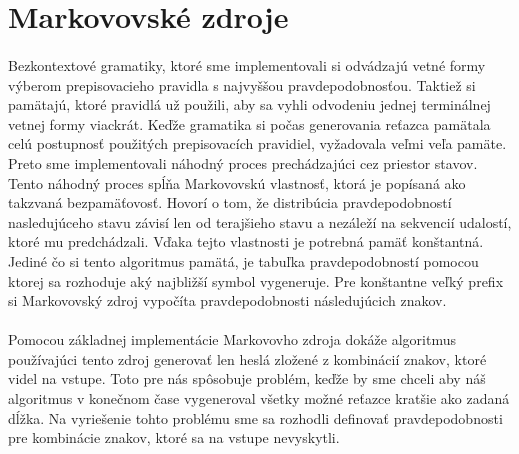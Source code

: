 \section{Markovovské zdroje}
\paragraph{}
Bezkontextové gramatiky, ktoré sme implementovali si odvádzajú vetné formy výberom prepisovacieho pravidla s najvyššou pravdepodobnosťou. Taktiež si pamätajú, ktoré pravidlá už použili, aby sa vyhli odvodeniu jednej terminálnej vetnej formy viackrát. Keďže gramatika si počas generovania reťazca pamätala celú postupnosť použitých prepisovacích pravidiel, vyžadovala veľmi veľa pamäte. Preto sme implementovali náhodný proces prechádzajúci cez priestor stavov. Tento náhodný proces spĺňa Markovovskú vlastnosť, ktorá je popísaná ako takzvaná bezpamäťovosť. Hovorí o tom, že distribúcia pravdepodobností nasledujúceho stavu závisí len od terajšieho stavu a nezáleží na sekvencií udalostí, ktoré mu predchádzali. Vďaka tejto vlastnosti je potrebná pamäť konštantná. Jediné čo si tento algoritmus pamätá, je tabuľka pravdepodobností pomocou ktorej sa rozhoduje aký najbližší symbol vygeneruje. Pre konštantne veľký prefix si Markovovský zdroj vypočíta pravdepodobnosti následujúcich znakov.

\paragraph{}
Pomocou základnej implementácie Markovovho zdroja dokáže algoritmus používajúci tento zdroj generovať len heslá zložené z kombinácií znakov, ktoré videl na vstupe. Toto pre nás spôsobuje problém, keďže by sme chceli aby náš algoritmus v konečnom čase vygeneroval všetky možné reťazce kratšie ako zadaná dĺžka. Na vyriešenie tohto problému sme sa rozhodli definovať pravdepodobnosti pre kombinácie znakov, ktoré sa na vstupe nevyskytli.